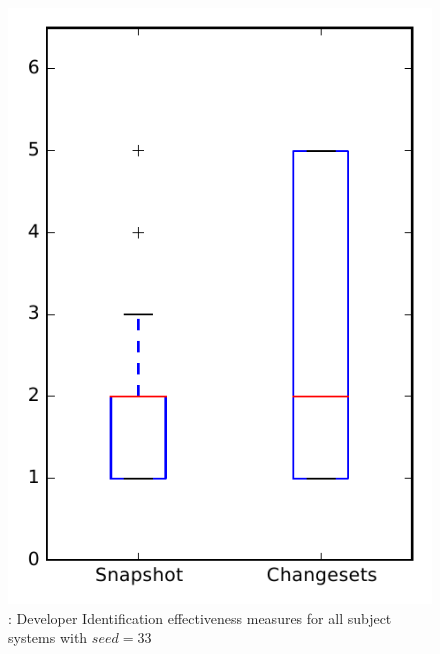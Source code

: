 
\begin{figure}
\centering
\includegraphics[height=0.4\textheight]{figures/dit_seed/rq1_overview_33}
\caption{\rtwo: Developer Identification effectiveness measures for all subject systems with $seed=33$}
\label{fig:dit_seed:rq1:overview}
\end{figure}
